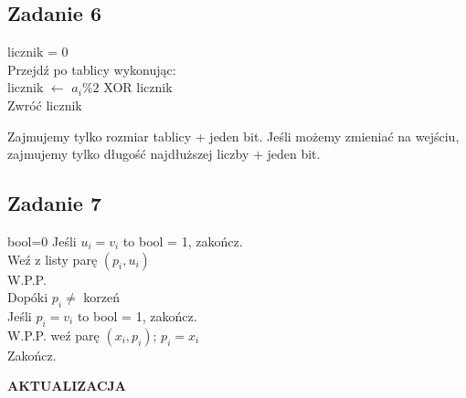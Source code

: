 \documentclass[a4paper]{article}
\begin{document}
\clearpage

\subsection*{Zadanie 6}
licznik = 0\\
Przejdź po tablicy wykonując:\\
\hspace*{2ex} licznik $\leftarrow$ $a_i \% 2$ XOR licznik\\
Zwróć licznik

Zajmujemy tylko rozmiar tablicy + jeden bit. Jeśli możemy zmieniać na wejściu, zajmujemy tylko długość najdłuższej liczby + jeden bit.

\subsection*{Zadanie 7}
bool=0
Jeśli $u_i=v_i$ to bool = 1, zakończ.\\
Weź z listy parę $(p_i,u_i)$\\
W.P.P.\\
Dopóki $p_i \neq$ korzeń\\
\hspace*{2ex} Jeśli $p_i=v_i$ to bool = 1, zakończ.\\
\hspace*{2ex} W.P.P. weź parę $(x_i,p_i)$; $p_i = x_i$\\
Zakończ.


\textbf{AKTUALIZACJA}
\end{document}
